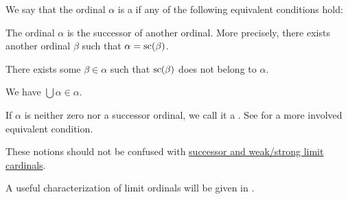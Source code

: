 \begin{definition}\label{def:successor_and_limit_ordinal}
  We say that the ordinal \( \alpha \) is a  if any of the following equivalent conditions hold:

  \begin{thmenum}
     The ordinal \( \alpha \) is the successor of another ordinal. More precisely, there exists another ordinal \( \beta \) such that \( \alpha = \op{sc}(\beta) \).

     There exists some \( \beta \in \alpha \) such that \( \op{sc}(\beta) \) does not belong to \( \alpha \).

     We have \( \bigcup \alpha \in \alpha \).
  \end{thmenum}

  If \( \alpha \) is neither zero nor a successor ordinal, we call it a . See  for a more involved equivalent condition.

  These notions should not be confused with \hyperref[def:successor_and_limit_cardinal]{successor and weak/strong limit cardinals}.
\end{definition}
\begin{comments}
  \item A useful characterization of limit ordinals will be given in .
\end{comments}
